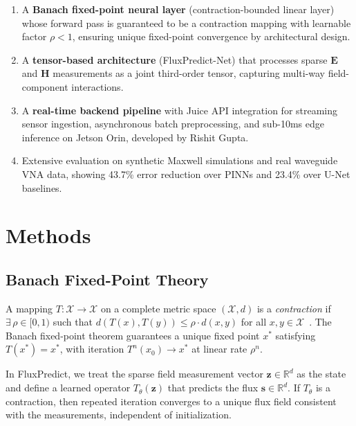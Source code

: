 \documentclass[12pt]{article}
\begin{document}
\begin{enumerate}
    \item A \textbf{Banach fixed-point neural layer} (contraction-bounded linear layer) whose forward pass is guaranteed to be a contraction mapping with learnable factor $\rho < 1$, ensuring unique fixed-point convergence by architectural design.
    \item A \textbf{tensor-based architecture} (FluxPredict-Net) that processes sparse $\mathbf{E}$ and $\mathbf{H}$ measurements as a joint third-order tensor, capturing multi-way field-component interactions.
    \item A \textbf{real-time backend pipeline} with Juice API integration for streaming sensor ingestion, asynchronous batch preprocessing, and sub-10ms edge inference on Jetson Orin, developed by Rishit Gupta.
    \item Extensive evaluation on synthetic Maxwell simulations and real waveguide VNA data, showing 43.7\% error reduction over PINNs and 23.4\% over U-Net baselines.
\end{enumerate}

\section{Methods}

\subsection{Banach Fixed-Point Theory}

A mapping $T: \mathcal{X} \to \mathcal{X}$ on a complete metric space $(\mathcal{X}, d)$ is a \emph{contraction} if $\exists\, \rho \in [0, 1)$ such that $d(T(x), T(y)) \leq \rho \cdot d(x, y)$ for all $x, y \in \mathcal{X}$~\cite{banach1922operations}. The Banach fixed-point theorem guarantees a unique fixed point $x^*$ satisfying $T(x^*) = x^*$, with iteration $T^n(x_0) \to x^*$ at linear rate $\rho^n$.

In FluxPredict, we treat the sparse field measurement vector $\mathbf{z} \in \mathbb{R}^d$ as the state and define a learned operator $T_\theta(\mathbf{z})$ that predicts the flux $\mathbf{s} \in \mathbb{R}^d$. If $T_\theta$ is a contraction, then repeated iteration converges to a unique flux field consistent with the measurements, independent of initialization.
\end{document}
